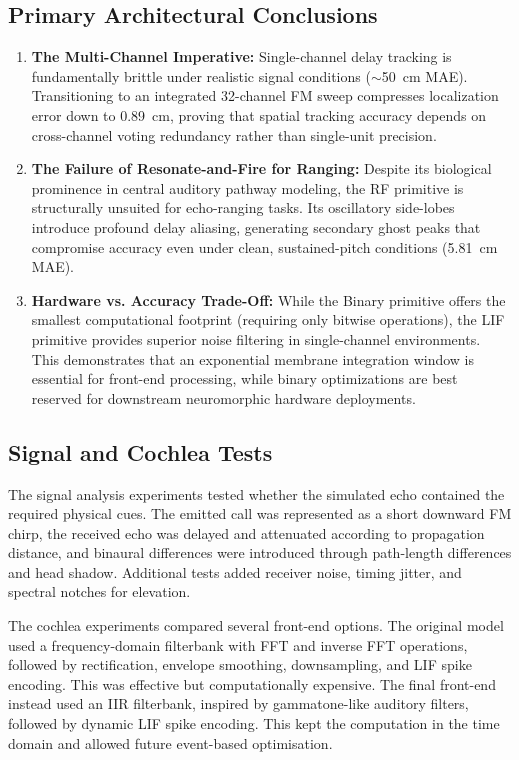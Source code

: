 \subsection{Primary Architectural Conclusions}

\begin{enumerate}
    \item \textbf{The Multi-Channel Imperative:} Single-channel delay tracking is fundamentally brittle under realistic signal conditions ($\sim$50~cm MAE). Transitioning to an integrated 32-channel FM sweep compresses localization error down to 0.89~cm, proving that spatial tracking accuracy depends on cross-channel voting redundancy rather than single-unit precision.
    \item \textbf{The Failure of Resonate-and-Fire for Ranging:} Despite its biological prominence in central auditory pathway modeling, the RF primitive is structurally unsuited for echo-ranging tasks. Its oscillatory side-lobes introduce profound delay aliasing, generating secondary ghost peaks that compromise accuracy even under clean, sustained-pitch conditions (5.81~cm MAE).
    \item \textbf{Hardware vs. Accuracy Trade-Off:} While the Binary primitive offers the smallest computational footprint (requiring only bitwise operations), the LIF primitive provides superior noise filtering in single-channel environments. This demonstrates that an exponential membrane integration window is essential for front-end processing, while binary optimizations are best reserved for downstream neuromorphic hardware deployments.
\end{enumerate}

\subsection{Signal and Cochlea Tests}

The signal analysis experiments tested whether the simulated echo contained the required physical cues. The emitted call was represented as a short downward FM chirp, the received echo was delayed and attenuated according to propagation distance, and binaural differences were introduced through path-length differences and head shadow. Additional tests added receiver noise, timing jitter, and spectral notches for elevation.

The cochlea experiments compared several front-end options. The original model used a frequency-domain filterbank with FFT and inverse FFT operations, followed by rectification, envelope smoothing, downsampling, and LIF spike encoding. This was effective but computationally expensive. The final front-end instead used an IIR filterbank, inspired by gammatone-like auditory filters, followed by dynamic LIF spike encoding. This kept the computation in the time domain and allowed future event-based optimisation.

